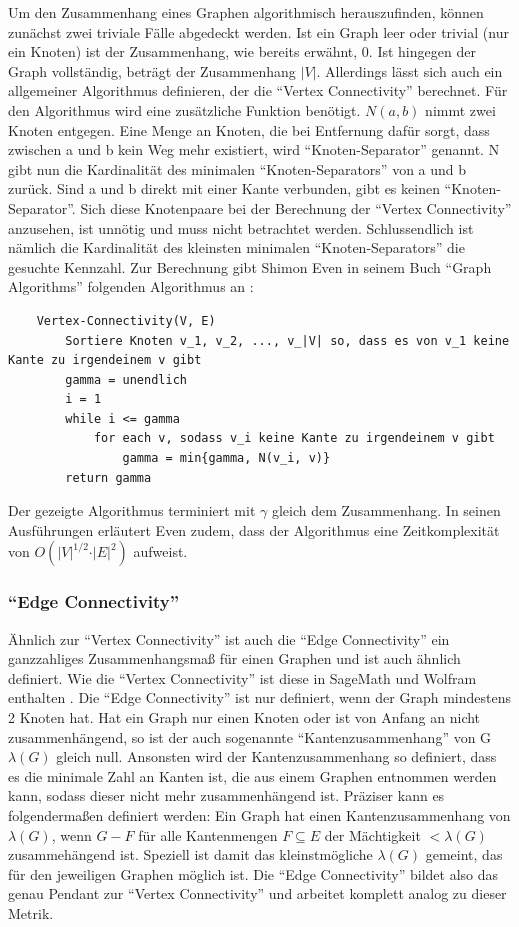 \documentclass[a4paper,12pt,ngerman,chapterprefix=false,listof=totoc,bibliography=totoc]{scrreprt}
\begin{document}
{Um den Zusammenhang eines Graphen algorithmisch herauszufinden, können zunächst zwei triviale Fälle abgedeckt werden. Ist ein Graph leer oder trivial (nur ein Knoten) ist der Zusammenhang, wie bereits erwähnt, 0. Ist hingegen der Graph vollständig, beträgt der Zusammenhang \(\vert V\vert\). Allerdings lässt sich auch ein allgemeiner Algorithmus definieren, der die "`Vertex Connectivity"' berechnet.  Für den Algorithmus wird eine zusätzliche Funktion benötigt. \(N(a,b)\) nimmt zwei Knoten entgegen. Eine Menge an Knoten, die bei Entfernung dafür sorgt, dass zwischen a und b kein Weg mehr existiert, wird "`Knoten-Separator"' genannt. N gibt nun die Kardinalität des minimalen "`Knoten-Separators"' von a und b zurück. Sind a und b direkt mit einer Kante verbunden, gibt es keinen "`Knoten-Separator"'. Sich diese Knotenpaare bei der Berechnung der "`Vertex Connectivity"' anzusehen, ist unnötig und muss nicht betrachtet werden. Schlussendlich ist nämlich die Kardinalität des kleinsten minimalen "`Knoten-Separators"' die gesuchte Kennzahl. Zur Berechnung gibt Shimon Even in seinem Buch "`Graph Algorithms"' folgenden Algorithmus an \cite{even_graph_2012}:
\begin{lstlisting}
	Vertex-Connectivity(V, E)
		Sortiere Knoten v_1, v_2, ..., v_|V| so, dass es von v_1 keine Kante zu irgendeinem v gibt
		gamma = unendlich
		i = 1
		while i <= gamma
			for each v, sodass v_i keine Kante zu irgendeinem v gibt
				gamma = min{gamma, N(v_i, v)}
		return gamma
\end{lstlisting}
Der gezeigte Algorithmus terminiert mit \(\gamma\) gleich dem Zusammenhang. In seinen Ausführungen erläutert Even zudem, dass der Algorithmus eine Zeitkomplexität von \(O(\vert V\vert^{1/2} \cdot \vert E\vert^2)\) aufweist.
}
\subsubsection*{"`Edge Connectivity"'}
{
Ähnlich zur "`Vertex Connectivity"' ist auch die "`Edge Connectivity"' ein ganzzahliges Zusammenhangsmaß für einen Graphen und ist auch ähnlich definiert. Wie die "`Vertex Connectivity"' ist diese in SageMath und Wolfram enthalten \cite{sagemath_graph_2020,wolfram_graph_2020}. Die "`Edge Connectivity"' ist nur definiert, wenn der Graph mindestens 2 Knoten hat. Hat ein Graph nur einen Knoten oder ist von Anfang an nicht zusammenhängend, so ist der auch sogenannte "`Kantenzusammenhang"' von G \(\lambda (G)\) gleich null. Ansonsten wird der Kantenzusammenhang so definiert, dass es die minimale Zahl an Kanten ist, die aus einem Graphen entnommen werden kann, sodass dieser nicht mehr zusammenhängend ist. Präziser kann es folgendermaßen definiert werden: Ein Graph hat einen Kantenzusammenhang von \(\lambda (G)\), wenn \(G - F\) für alle Kantenmengen \(F\subseteq E\) der Mächtigkeit \(< \lambda (G)\) zusammehängend ist. Speziell ist damit das kleinstmögliche \(\lambda (G)\) gemeint, das für den jeweiligen Graphen möglich ist. \cite{diestel_graphentheorie_2000} Die "`Edge Connectivity"' bildet also das genau Pendant zur "`Vertex Connectivity"' und arbeitet komplett analog zu dieser Metrik.

}
\end{document}
